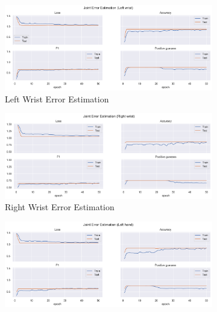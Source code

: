  
  \begin{figure}[!htbp]
    \centering
    \begin{subfigure}[b]{0.47\linewidth}
        \centering
        \includegraphics[width=\textwidth]{figures/Results/v2/jt/Left wrist_ErrorEstimation.png}
        \caption{Left Wrist Error Estimation}
        \label{fig:v2_lewr_jt_ee}
    \end{subfigure}
    \hfill
    \begin{subfigure}[b]{0.47\linewidth}
        \centering
        \includegraphics[width=\textwidth]{figures/Results/v2/jt/Right wrist_ErrorEstimation.png}
        \caption{Right Wrist Error Estimation}
        \label{fig:v2_riwr_jt_ee}
    \end{subfigure}
    \hfill
    \begin{subfigure}[b]{0.47\linewidth}
        \centering
        \includegraphics[width=\textwidth]{figures/Results/v2/jt/Left hand_ErrorEstimation.png}

\end{subfigure}
\end{figure}

